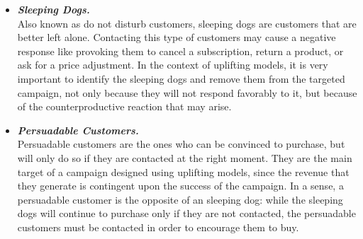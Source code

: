 \documentclass{article}
\begin{document}
\begin{enumerate}[label=(\alph*)]
\begin{enumerate}[label=\arabic*.]
\begin{itemize}
    \item \textit{\textbf{Sleeping Dogs.}}\\
    Also known as do not disturb customers, sleeping dogs are customers that are better left alone. Contacting this type of customers may cause a negative response like provoking them to cancel a subscription, return a product, or ask for a price adjustment. In the context of uplifting models, it is very important to identify the sleeping dogs and remove them from the targeted campaign, not only because they will not respond favorably to it, but because of the counterproductive reaction that may arise. 
    \item \textit{\textbf{Persuadable Customers.}}\\
    Persuadable customers are the ones who can be convinced to purchase, but will only do so if they are contacted at the right moment. They are the main target of a campaign designed using uplifting models, since the revenue that they generate is contingent upon the success of the campaign. In a sense, a persuadable customer is the opposite of an sleeping dog: while the sleeping dogs will continue to purchase only if they are not contacted, the persuadable customers must be contacted in order to encourage them to buy.
    \newline
\end{itemize}


\end{enumerate}
\end{enumerate}
\end{document}
